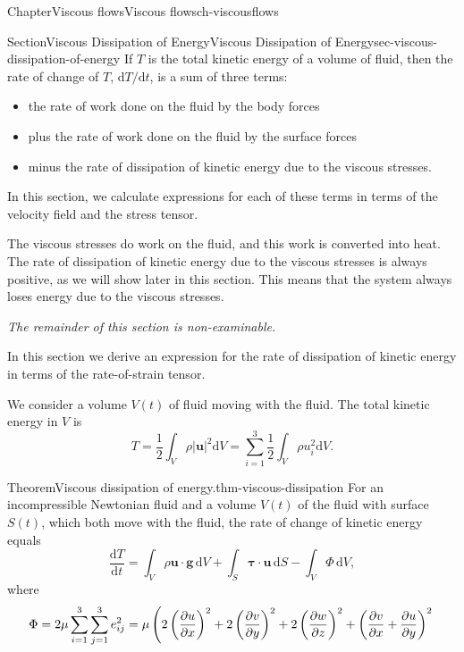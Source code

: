 \documentclass[oneside,10pt,]{book}
\newcommand{\ptxlistdisc}{\raisebox{0.3ex}{\textbullet}}
\numberwithin{equation}{section}
\newcommand{\de}{\mathrm{d}}
\newcommand{\dd}[2]{\frac{\de#1}{\de#2}}
\newcommand{\pd}[2]{\frac{\partial#1}{\partial#2}}
\newcommand{\bu}{\boldsymbol{u}}
\newcommand{\bg}{\boldsymbol{g}}
\newcommand{\btau}{\boldsymbol{\tau}}
\begin{document}
\begin{chapterptx}{Chapter}{Viscous flows}{}{Viscous flows}{}{}{ch-viscousflows}
\typeout{************************************************}
%
\begin{sectionptx}{Section}{Viscous Dissipation of Energy}{}{Viscous Dissipation of Energy}{}{}{sec-viscous-dissipation-of-energy}
If \(T\) is the total kinetic energy of a volume of fluid, then the rate of change of \(T\), \(\de T/\de t\), is a sum of three terms:%
\begin{itemize}[label=\ptxlistdisc]
\item{}the rate of work done on the fluid by the body forces%
\item{}plus the rate of work done on the fluid by the surface forces%
\item{}minus the rate of dissipation of kinetic energy due to the viscous stresses.%
\end{itemize}
In this section, we calculate expressions for each of these terms in terms of the velocity field and the stress tensor.%
\par
The viscous stresses do work on the fluid, and this work is converted into heat. The rate of dissipation of kinetic energy due to the viscous stresses is always positive, as we will show later in this section. This means that the system always loses energy due to the viscous stresses.%
\par
\emph{The remainder of this section is non-examinable.}%
\par
In this section we derive an expression for the rate of dissipation of kinetic energy in terms of the rate-of-strain tensor.%
\par
We consider a volume \(V(t)\) of fluid moving with the fluid. The total kinetic energy in \(V\) is%
\begin{equation*}
T=\frac12\int_V\rho\left|\bu\right|^2\de V
=\sum_{i=1}^3\frac12\int_V\rho u_i^2\de V.
\end{equation*}
%
\begin{theorem}{Theorem}{Viscous dissipation of energy.}{}{thm-viscous-dissipation}%
For an incompressible Newtonian fluid and a volume \(V(t)\) of the fluid with surface \(S(t)\), which both move with the fluid, the rate of change of kinetic energy equals%
\begin{equation}
\dd{T}{t}=\int_V\rho\bu\cdot\bg\,\de V+\int_S\btau\cdot\bu\,\de S-\int_V\Phi\,\de V,\label{eq-viscous-dissipation}
\end{equation}
where%
\begin{equation*}
\Phi=2\mu\sum_{i=1}^3\sum_{j=1}^3e_{ij}^2
=\mu\left(2\left(\pd{u}{x}\right)^2+2\left(\pd{v}{y}\right)^2+2\left(\pd{w}{z}\right)^2+\left(\pd{v}{x}+\pd{u}{y}\right)^2\right.\\

\end{equation*}
\end{theorem}
\end{sectionptx}
\end{chapterptx}
\end{document}
